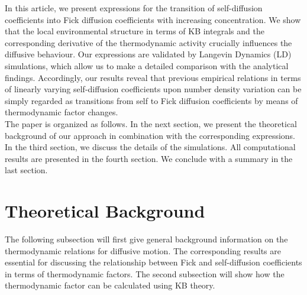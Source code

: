 \documentclass[aip,jcp,reprint]{revtex4-1}
\begin{document}
In this article, we present expressions for the transition of self-diffusion coefficients into Fick diffusion coefficients with increasing concentration. We show that the local environmental structure in terms of KB integrals and the corresponding derivative of the thermodynamic activity crucially influences the diffusive behaviour. Our expressions are validated by Langevin Dynamics (LD) simulations, which allow us to make a detailed comparison with the analytical findings. Accordingly, our results reveal that previous empirical relations in terms of linearly varying self-diffusion coefficients upon number density variation can be simply regarded as transitions from self to Fick diffusion coefficients by means of thermodynamic factor changes. \\
The paper is organized as follows. In the next section, we present the theoretical background of our approach in combination with the corresponding expressions. In the third section, we discuss the details of the
simulations. All computational results are presented in the fourth section.
We conclude with a summary in the last section.

\section{Theoretical Background}
The following subsection will first give general background information on the thermodynamic relations for diffusive motion. The corresponding results are essential for discussing the relationship between Fick and self-diffusion coefficients in terms of thermodynamic factors. The second subsection will show how the thermodynamic factor can be calculated using KB theory. 
\end{document}
